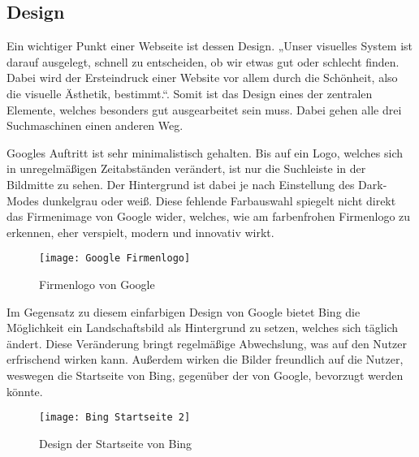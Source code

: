 \subsection{Design}\label{subsec:design}
Ein wichtiger Punkt einer Webseite ist dessen Design.
„Unser visuelles System ist darauf ausgelegt, schnell zu entscheiden, ob wir etwas gut oder schlecht finden.
Dabei wird der Ersteindruck einer Website vor allem durch die Schönheit,
also die visuelle Ästhetik, bestimmt.“\autocite[Seite 43]{Thielsch.}.
Somit ist das Design eines der zentralen Elemente, welches besonders gut ausgearbeitet sein muss.
Dabei gehen alle drei Suchmaschinen einen anderen Weg.

Googles Auftritt ist sehr minimalistisch gehalten.
Bis auf ein Logo, welches sich in unregelmäßigen Zeitabständen verändert,
ist nur die Suchleiste in der Bildmitte zu sehen.
Der Hintergrund ist dabei je nach Einstellung des Dark-Modes dunkelgrau oder weiß.
Diese fehlende Farbauswahl spiegelt nicht direkt das Firmenimage von Google wider, welches, wie am farbenfrohen
Firmenlogo zu erkennen, eher verspielt, modern und innovativ wirkt.
\begin{figure}[ht]
    \centering
    \texttt{[image: Google Firmenlogo]}
    \caption{Firmenlogo von Google\autocite{.2020}}\label{fig:figure4}
\end{figure}

Im Gegensatz zu diesem einfarbigen Design von Google bietet Bing die Möglichkeit ein Landschaftsbild als Hintergrund zu
setzen, welches sich täglich ändert.
Diese Veränderung bringt regelmäßige Abwechslung, was auf den Nutzer erfrischend wirken kann.
Außerdem wirken die Bilder freundlich auf die Nutzer, weswegen die Startseite von Bing, gegenüber der von Google,
bevorzugt werden könnte.
\begin{figure}[ht]
    \centering
    \texttt{[image: Bing Startseite 2]}
    \caption{Design der Startseite von Bing}\label{fig:figure5}
\end{figure}

